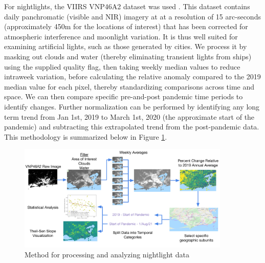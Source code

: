 For nightlights, the VIIRS VNP46A2 dataset was used \cite{romanNASABlackMarble2018}. This dataset contains daily panchromatic (visible and NIR) imagery at at a resolution of 15 arc-seconds (approximately 450m for the locations of interest) that has been corrected for atmospheric interference and moonlight variation. It is thus well suited for examining artificial lights, such as those generated by cities. We process it by masking out clouds and water (thereby eliminating transient lights from ships) using the supplied quality flag, then taking weekly median values to reduce intraweek variation, before calculating the relative anomaly compared to the 2019 median value for each pixel, thereby standardizing comparisons across time and space. We can then compare specific pre-and-post pandemic time periods to identify changes. Further normalization can be performed by identifying any long term trend from Jan 1st, 2019 to March 1st, 2020 (the approximate start of the pandemic) and subtracting this extrapolated trend from the post-pandemic data. This methodology is summarized below in Figure \ref{fig:nightlights_method}.

\begin{figure}[h]
\centering
\includegraphics[width=0.9\textwidth]{Figures/chap5/nightlights_method.png}
\caption[Nightlights Processing Methodology]{Method for processing and analyzing nightlight data}
\label{fig:nightlights_method}
\end{figure}

